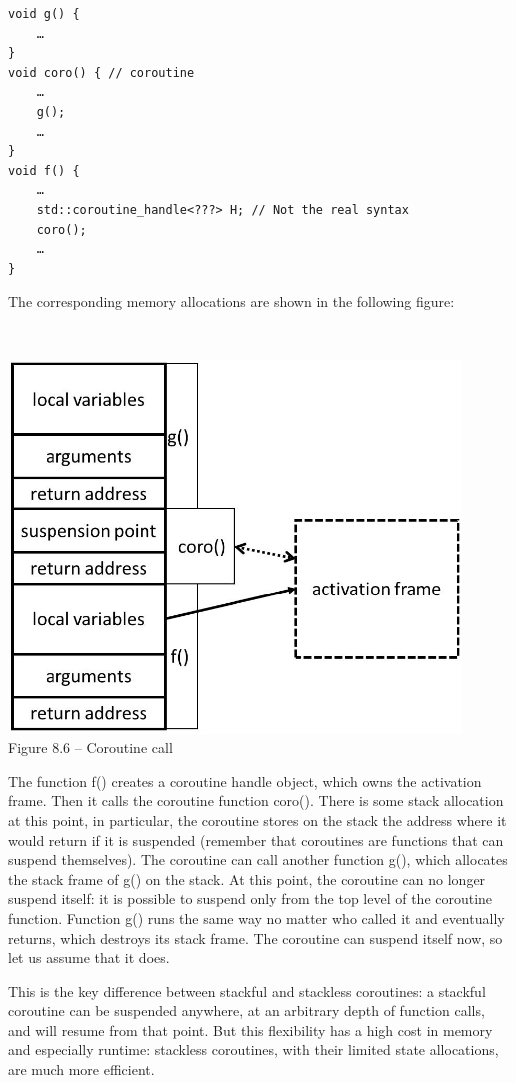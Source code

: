 \begin{lstlisting}[style=styleCXX]
void g() {
	…
}
void coro() { // coroutine
	…
	g();
	…
}
void f() {
	…
	std::coroutine_handle<???> H; // Not the real syntax
	coro();
	…
}
\end{lstlisting}

The corresponding memory allocations are shown in the following figure:

\hspace*{\fill} \\ %
\begin{center}
\includegraphics[width=0.9\textwidth]{content/2/chapter8/images/6.jpg}\\
Figure 8.6 – Coroutine call
\end{center}

The function f() creates a coroutine handle object, which owns the activation frame. Then it calls the coroutine function coro(). There is some stack allocation at this point, in particular, the coroutine stores on the stack the address where it would return if it is suspended (remember that coroutines are functions that can suspend themselves). The coroutine can call another function g(), which allocates the stack frame of g() on the stack. At this point, the coroutine can no longer suspend itself: it is possible to suspend only from the top level of the coroutine function. Function g() runs the same way no matter who called it and eventually returns, which destroys its stack frame. The coroutine can suspend itself now, so let us assume that it does. 

This is the key difference between stackful and stackless coroutines: a stackful coroutine can be suspended anywhere, at an arbitrary depth of function calls, and will resume from that point. But this flexibility has a high cost in memory and especially runtime: stackless coroutines, with their limited state allocations, are much more efficient.

